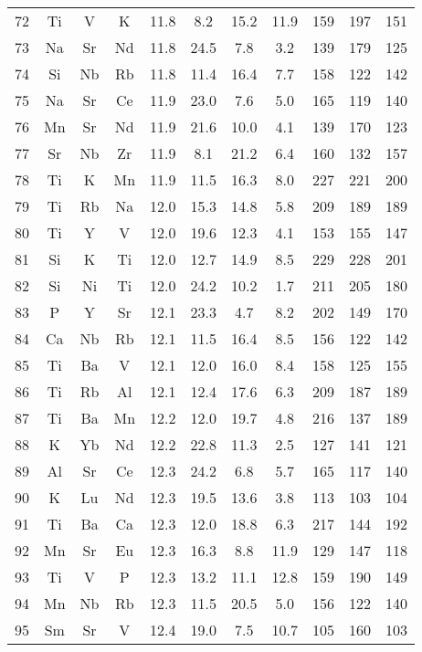 \begin{center}
\begin{xtabular}{c|ccc|cccc|ccc}
 72 &  Ti &   V &   K &  11.8 & 8.2 &  15.2 &  11.9 & 159 & 197 & 151 \\
 73 &  Na &  Sr &  Nd &  11.8 &  24.5 & 7.8 & 3.2 & 139 & 179 & 125 \\
 74 &  Si &  Nb &  Rb &  11.8 &  11.4 &  16.4 & 7.7 & 158 & 122 & 142 \\
 75 &  Na &  Sr &  Ce &  11.9 &  23.0 & 7.6 & 5.0 & 165 & 119 & 140 \\
 76 &  Mn &  Sr &  Nd &  11.9 &  21.6 &  10.0 & 4.1 & 139 & 170 & 123 \\
 77 &  Sr &  Nb &  Zr &  11.9 & 8.1 &  21.2 & 6.4 & 160 & 132 & 157 \\
 78 &  Ti &   K &  Mn &  11.9 &  11.5 &  16.3 & 8.0 & 227 & 221 & 200 \\
 79 &  Ti &  Rb &  Na &  12.0 &  15.3 &  14.8 & 5.8 & 209 & 189 & 189 \\
 80 &  Ti &   Y &   V &  12.0 &  19.6 &  12.3 & 4.1 & 153 & 155 & 147 \\
 81 &  Si &   K &  Ti &  12.0 &  12.7 &  14.9 & 8.5 & 229 & 228 & 201 \\
 82 &  Si &  Ni &  Ti &  12.0 &  24.2 &  10.2 & 1.7 & 211 & 205 & 180 \\
 83 &   P &   Y &  Sr &  12.1 &  23.3 & 4.7 & 8.2 & 202 & 149 & 170 \\
 84 &  Ca &  Nb &  Rb &  12.1 &  11.5 &  16.4 & 8.5 & 156 & 122 & 142 \\
 85 &  Ti &  Ba &   V &  12.1 &  12.0 &  16.0 & 8.4 & 158 & 125 & 155 \\
 86 &  Ti &  Rb &  Al &  12.1 &  12.4 &  17.6 & 6.3 & 209 & 187 & 189 \\
 87 &  Ti &  Ba &  Mn &  12.2 &  12.0 &  19.7 & 4.8 & 216 & 137 & 189 \\
 88 &   K &  Yb &  Nd &  12.2 &  22.8 &  11.3 & 2.5 & 127 & 141 & 121 \\
 89 &  Al &  Sr &  Ce &  12.3 &  24.2 & 6.8 & 5.7 & 165 & 117 & 140 \\
 90 &   K &  Lu &  Nd &  12.3 &  19.5 &  13.6 & 3.8 & 113 & 103 & 104 \\
 91 &  Ti &  Ba &  Ca &  12.3 &  12.0 &  18.8 & 6.3 & 217 & 144 & 192 \\
 92 &  Mn &  Sr &  Eu &  12.3 &  16.3 & 8.8 &  11.9 & 129 & 147 & 118 \\
 93 &  Ti &   V &   P &  12.3 &  13.2 &  11.1 &  12.8 & 159 & 190 & 149 \\
 94 &  Mn &  Nb &  Rb &  12.3 &  11.5 &  20.5 & 5.0 & 156 & 122 & 140 \\
 95 &  Sm &  Sr &   V &  12.4 &  19.0 & 7.5 &  10.7 & 105 & 160 & 103 \\

\end{xtabular}
\end{center}
